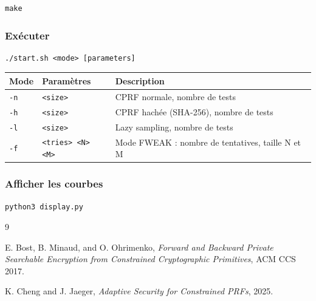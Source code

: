 \documentclass[9pt]{extarticle}
\begin{document}
\begin{verbatim}
make
\end{verbatim}

\subsubsection*{Exécuter}

\begin{verbatim}
./start.sh <mode> [parameters]
\end{verbatim}

\begin{center}
\begin{tabular}{|l|l|l|}
\hline
\textbf{Mode} & \textbf{Paramètres} & \textbf{Description} \\
\hline
\texttt{-n} & \texttt{<size>} & CPRF normale, nombre de tests \\
\hline
\texttt{-h} & \texttt{<size>} & CPRF hachée (SHA-256), nombre de tests \\
\hline
\texttt{-l} & \texttt{<size>} & Lazy sampling, nombre de tests \\
\hline
\texttt{-f} & \texttt{<tries> <N> <M>} & Mode FWEAK : nombre de tentatives, taille N et M \\
\hline
\end{tabular}
\end{center}

\subsubsection*{Afficher les courbes}

\begin{verbatim}
python3 display.py
\end{verbatim}

\appendix

\begin{thebibliography}{9}

E. Bost, B. Minaud, and O. Ohrimenko,
\textit{Forward and Backward Private Searchable Encryption from
Constrained Cryptographic Primitives},
ACM CCS 2017.

K. Cheng and J. Jaeger,
\textit{Adaptive Security for Constrained PRFs},
2025.

\end{thebibliography}
\end{document}

